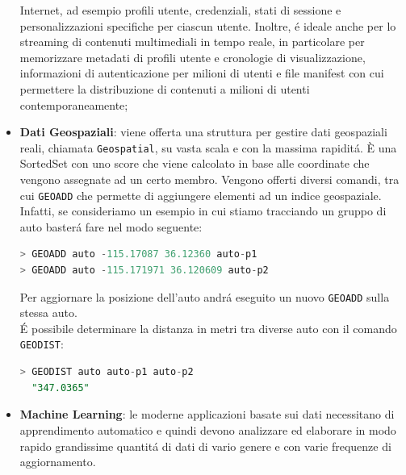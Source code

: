 \begin{itemize}
    Internet, ad esempio profili utente, credenziali, stati di sessione e personalizzazioni specifiche per ciascun utente. Inoltre, é ideale anche
    per lo streaming di contenuti multimediali in tempo reale, in particolare per memorizzare metadati di profili utente e cronologie di visualizzazione,
    informazioni di autenticazione per milioni di utenti e file manifest con cui permettere la distribuzione di contenuti a milioni di utenti
    contemporaneamente;
    \item \textbf{Dati Geospaziali}: viene offerta una struttura per gestire dati geospaziali reali, chiamata \texttt{Geospatial},
    su vasta scala e con la massima rapiditá. È una SortedSet con uno score che viene calcolato in base alle coordinate che vengono assegnate ad un certo membro.
    Vengono offerti diversi comandi, tra cui \texttt{GEOADD} che permette di aggiungere elementi ad un indice geospaziale.
    Infatti, se consideriamo un esempio in cui stiamo tracciando un gruppo di auto basterá fare nel modo seguente:
    \begin{lstlisting}[autogobble, style=redis-cli, language=SQL]
> GEOADD auto -115.17087 36.12360 auto-p1
> GEOADD auto -115.171971 36.120609 auto-p2\end{lstlisting}
    Per aggiornare la posizione dell'auto andrá eseguito un nuovo \texttt{GEOADD} sulla stessa auto.\\
    É possibile determinare la distanza in metri tra diverse auto con il comando \texttt{GEODIST}:
    \begin{lstlisting}[autogobble, style=redis-cli, language=SQL]
> GEODIST auto auto-p1 auto-p2
  "347.0365"\end{lstlisting}
    \item \textbf{Machine Learning}: le moderne applicazioni basate sui dati necessitano di apprendimento automatico e quindi devono analizzare
    ed elaborare in modo rapido grandissime quantitá di dati di vario genere e con varie frequenze di aggiornamento.
\end{itemize}


